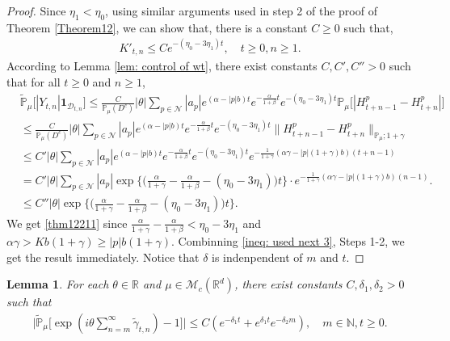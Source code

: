 \documentclass[12pt,a4paper]{amsart}
\theoremstyle{plain}
\newtheorem{lem}[thm]{Lemma}
\theoremstyle{definition}
\numberwithin{equation}{section}
\begin{document}
\begin{proof}
Since $\eta_1 < \eta_0$,  using similar arguments used in  step 2 of the proof of Theorem \ref{Theorem12},
we can show that, there is a constant $C\geq 0$ such that,
\begin{align}
\label{ineq: control of Kkt1}
     K'_{t,n}
     \leq C e^{-(\eta_0 - 3\eta_1) t},
     \quad t \geq 0, n\geq 1.
\end{align}
   According to Lemma \ref{lem: control of wt},
    there exist constants $C,C',C''>0$ such that  for all $t\geq 0$ and $n\geq 1$,
    \begin{align}\label{ineq:used next 2}
        &\tilde{\mathbb{P}}_{\mu}\big[|Y_{t,n}|\mathbf{1}_{\mathcal{D}_{t,n}}\big]\leq \frac{C}{\mathbb{P}_{\mu}(D^c)} |\theta|\sum_{p\in\mathcal{N}}|a_p|e^{(\alpha-|p|b)t}e^{-\frac{\alpha}{1+\beta}t}e^{-(\eta_0-3\eta_1)t}\mathbb{P}_{\mu}\Big[|H_{t+n-1}^p-H_{t+n}^p|\Big]\\
        &\leq \frac{C}{\mathbb{P}_{\mu}(D^c)} |\theta|\sum_{p\in\mathcal{N}}|a_p|e^{(\alpha-|p|b)t}e^{-\frac{\alpha}{1+\beta}t}e^{-(\eta_0-3\eta_1)t}\|H_{t+n-1}^p-H_{t+n}^p\|_{\mathbb{P}_{\mu};1+\gamma}
        \\&\leq C' |\theta|\sum_{p\in\mathcal{N}}|a_p|e^{(\alpha-|p|b)t}e^{-\frac{\alpha}{1+\beta}t}e^{-(\eta_0-3\eta_1)t}e^{-\frac{1}{1+\gamma}(\alpha\gamma-|p|(1+\gamma)b)(t+n-1)}\\
        &=C'|\theta|\sum_{p\in\mathcal{N}}|a_p|\exp\Big\{\Big(\frac{\alpha}{1+\gamma}-\frac{\alpha}{1+\beta}-(\eta_0-3\eta_1)\Big)t\Big\}\cdot e^{-\frac{1}{1+\gamma}(\alpha\gamma-|p|(1+\gamma)b)(n-1)}.\\
        &\leq C''|\theta|\exp\Big\{\Big(\frac{\alpha}{1+\gamma}-\frac{\alpha}{1+\beta}-(\eta_0-3\eta_1)\Big)t\Big\}.
    \end{align}
    We get \eqref{thm12211} since $\frac{\alpha}{1+\gamma}-\frac{\alpha}{1+\beta}<\eta_0-3\eta_1$ and $\alpha\gamma>Kb(1+\gamma)\geq |p|b(1+\gamma)$.
  Combinning \eqref{ineq: used next 3}, Steps 1-2, we get the result immediately. Notice that $\delta$ is indenpendent of $m$ and $t$.
\end{proof}
\begin{lem}\label{lem: lemma05}
For each $\theta\in \mathbb{R}$ and $\mu \in \mathcal{M}_c(\mathbb{R}^d)$, there exist constants $C,\delta_1,\delta_2>0$ such that
\begin{align}
  \Big|\tilde{\mathbb{P}}_{\mu}\Big[\exp(i\theta \sum_{n=m}^{\infty}\tilde{\gamma}_{t,n})-1\Big]\Big|\leq C(e^{-\delta_1 t}+e^{\delta_1 t}e^{-\delta_2 m}),\quad m\in \mathbb{N}, t\geq 0.
\end{align}
\end{lem}
\end{document}
